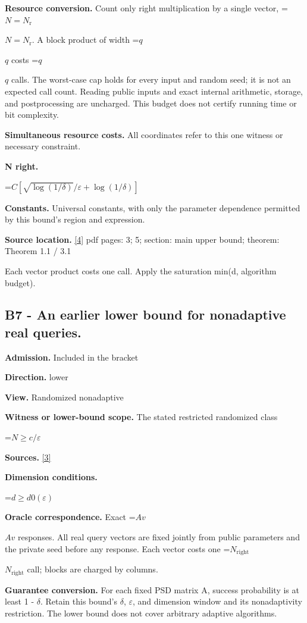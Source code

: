 \documentclass[10pt,a4paper]{article}
\newcommand{\AtlasMath}[1]{\par\begingroup\centering\setbox0=\hbox{$\displaystyle #1$}\ifdim\wd0>1.4\linewidth\typeout{ATLAS WIDE FORMULA: \the\wd0}\fi\ifdim\wd0>\linewidth\resizebox{\linewidth}{!}{\box0}\else\box0\fi\par\endgroup}
\newcommand{\AtlasInlineMath}[1]{\begingroup\setbox0=\hbox{$#1$}\ifdim\wd0>.4\linewidth\endgroup\AtlasMath{#1}\else\endgroup$#1$\fi}
\begin{document}
\textbf{Resource conversion.} Count only right multiplication by a single vector, \AtlasInlineMath{N=N_{\mathrm r}}. A block product of width \AtlasInlineMath{q} costs \AtlasInlineMath{q} calls. The worst-case cap holds for every input and random seed; it is not an expected call count. Reading public inputs and exact internal arithmetic, storage, and postprocessing are uncharged. This budget does not certify running time or bit complexity.

\textbf{Simultaneous resource costs.} All coordinates refer to this one witness or necessary constraint.

\textbf{N right.}

\AtlasMath{C[\sqrt{\log(1/\delta)}/\varepsilon+\log(1/\delta)]}
\textbf{Constants.} Universal constants, with only the parameter dependence permitted by this bound’s region and expression.

\textbf{Source location.} \href{https://proceedings.neurips.cc/paper/2021/file/c77bfda61a0204d445185053e6a9a8fe-Paper.pdf}{[4]} pdf pages: 3; 5; section: main upper bound; theorem: Theorem 1.1 / 3.1

Each vector product costs one call. Apply the saturation min(d, algorithm budget).

\subsection{B7 - An earlier lower bound for nonadaptive real queries.}
\textbf{Admission.} Included in the bracket

\textbf{Direction.} lower

\textbf{View.} Randomized nonadaptive

\textbf{Witness or lower-bound scope.} The stated restricted randomized class

\AtlasMath{N\ge c/\varepsilon}
\textbf{Sources.} \href{https://arxiv.org/pdf/2010.09649v5}{[3]}

\textbf{Dimension conditions.}

\AtlasMath{d\ge d0(\varepsilon )}
\textbf{Oracle correspondence.} Exact \AtlasInlineMath{Av} responses. All real query vectors are fixed jointly from public parameters and the private seed before any response. Each vector costs one \AtlasInlineMath{N_{\mathrm{right}}} call; blocks are charged by columns.

\textbf{Guarantee conversion.} For each fixed PSD matrix A, success probability is at least 1 - $\delta$. Retain this bound’s $\delta$, $\varepsilon$, and dimension window and its nonadaptivity restriction. The lower bound does not cover arbitrary adaptive algorithms.
\end{document}
